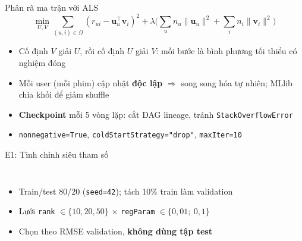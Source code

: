

\begin{frame}{Phân rã ma trận với ALS}
  \[
    \min_{U,V} \sum_{(u,i) \in \Omega} \left( r_{ui} - \mathbf{u}_u^\top \mathbf{v}_i \right)^2
    + \lambda \Big( \sum_u n_u \lVert \mathbf{u}_u \rVert^2 + \sum_i n_i \lVert \mathbf{v}_i \rVert^2 \Big)
  \]
  \begin{itemize}
    \item Cố định $V$ giải $U$, rồi cố định $U$ giải $V$: mỗi bước là bình phương tối thiểu có nghiệm đóng
    \item Mỗi user (mỗi phim) cập nhật \textbf{độc lập} $\Rightarrow$ song song hóa tự nhiên; MLlib chia khối để giảm shuffle
    \item \textbf{Checkpoint} mỗi 5 vòng lặp: cắt DAG lineage, tránh \texttt{StackOverflowError}
    \item \texttt{nonnegative=True}, \texttt{coldStartStrategy="drop"}, \texttt{maxIter=10}
  \end{itemize}
\end{frame}

\begin{frame}{E1: Tinh chỉnh siêu tham số}
  \begin{columns}[c]
    \centering
    \begin{itemize}
      \item Train/test 80/20 (\texttt{seed=42}); tách 10\% train làm validation
      \item Lưới \texttt{rank} $\in \{10, 20, 50\}$ $\times$ \texttt{regParam} $\in \{0{,}01;\ 0{,}1\}$
      \item Chọn theo RMSE validation, \textbf{không dùng tập test}
    \end{itemize}
  \end{columns}
\end{frame}

